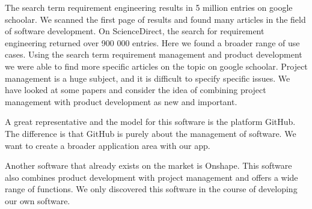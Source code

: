     The search term requirement engineering results in 5 million entries on google schoolar. We scanned the first page of results and found many articles in the field of software development. On ScienceDirect, the search for requirement engineering returned over 900 000 entries. Here we found a broader range of use cases. Using the search term requirement management and product development we were able to find more specific articles on the topic on google schoolar. Project management is a huge subject, and it is difficult to specify specific issues. We have looked at some papers and consider the idea of combining project management with product development as new and important.

    A great representative and the model for this software is the platform GitHub. The difference is that GitHub is purely about the management of software. We want to create a broader application area with our app. 

    Another software that already exists on the market is Onshape. This software also combines product development with project management and offers a wide range of functions. We only discovered this software in the course of developing our own software. 
